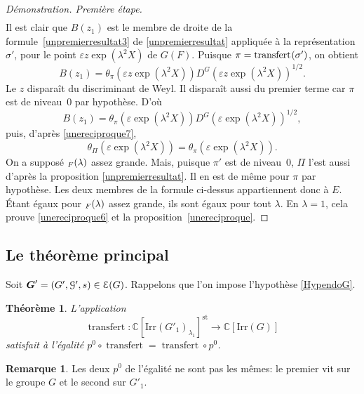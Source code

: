 \documentclass[11pt]{article}
\numberwithin{equation}{section}\providecommand{\og}{«\,}\providecommand{\fg}{\,»}
\let\mathcal \EuScript
\newcommand{\NoChangel}[1]{%
\expandafter\let\csname old\string#1\endcsname=#1
\let#1=\relax
\newcommand{#1}{\mathcode`l="716C\csname old\string#1\endcsname\mathcode`l="7160 }%
}
\let\epsilon\varepsilon
\newcommand{\rell}{\mathrm{ell}} \NoChangel{\rell}
\newcommand{\Irr}{\mathrm{Irr}}
\newcommand{\st}{\mathrm{st}}
\DeclareMathOperator{\transfert}{transfert}
\DeclareMathOperator{\val}{val} \NoChangel{\val}
\newcommand{\bG}{\boldsymbol{G}}
\newcommand{\cE}{\mathcal{E}}
\newcommand{\cG}{\mathcal{G}}
\newcommand{\CC}{\mathbb{C}}
\theoremstyle{plain}
\newtheorem*{thm*}{Théorème}
\theoremstyle{definition}
\newtheorem*{rem*}{Remarque}
\renewcommand{\proofname}{Démonstration}
\begin{document}
\begin{proof}[\proofname. Première étape]
\begin{multline*}
\end{multline*}
Il est clair que $B(z_{1})$ est le membre de droite de la formule~\eqref{unpremierresultat3} de \ref{unpremierresultat} appliquée à la représentation $\sigma'$, pour le point $\epsilon z \exp(\lambda^2X)$ de $G(F)$. Puisque $\pi=\transfert_{\rell}(\sigma')$, on obtient
\[
B(z_{1})=\theta_{\pi}(\epsilon z \exp(\lambda^2X))D^G(\epsilon z \exp(\lambda^2X))^{1/2}.
\]
Le $z$ disparaît du discriminant de Weyl. Il disparaît aussi du premier terme car $\pi$ est de niveau~$0$ par hypothèse. D'où
\[
B(z_{1})=\theta_{\pi}(\epsilon \exp(\lambda^2X))D^G(\epsilon \exp(\lambda^2X))^{1/2},
\]
puis, d'après \eqref{unereciproque7},
\[
\theta_{\Pi}( \epsilon \exp(\lambda^2X)) =\theta_{\pi}( \epsilon \exp(\lambda^2X)).
\]
On a supposé $\val_{F}(\lambda)$ assez grande. Mais, puisque $\pi'$ est de niveau~$0$, $\Pi$ l'est aussi d'après la proposition \ref{unpremierresultat}. Il en est de même pour $\pi$ par hypothèse. Les deux membres de la formule ci-dessus appartiennent donc à $E$. Étant égaux pour $\val_{F}(\lambda)$ assez grande, ils sont égaux pour tout $\lambda$. En $\lambda=1$, cela prouve \eqref{unereciproque6} et la proposition~\ref{unereciproque}.
\end{proof}

\subsection{Le théorème principal}\label{letheoreme}

Soit $\bG'=(G',\cG',s)\in \cE(G)$. Rappelons que l'on impose l'hypothèse \ref{HypendoG}.
\begin{thm*}
L'application
\[
\transfert:\CC[\Irr(G'_{1})_{\lambda_{1}}]^{\st}\to \CC[\Irr(G)]
\]
satisfait à l'égalité $p^0\circ \transfert=\transfert\circ p^0$.
\end{thm*}

\begin{rem*}
Les deux $p^0$ de l'égalité ne sont pas les mêmes: le premier vit sur le groupe $G$ et le second sur $G'_{1}$.
\end{rem*}
\end{document}

